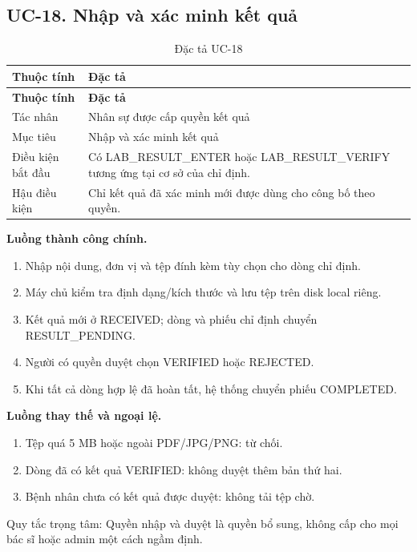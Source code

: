 \clearpage

\subsection{UC-18.\allowbreak{} Nhập và xác minh kết quả}
\label{uc:18}

{\small\setlength{\tabcolsep}{3pt}\renewcommand{\arraystretch}{1.12}
\begin{longtable}{@{}L{\textwidth-1.32pt\relax} L{\textwidth-4.68pt\relax}@{}}
\caption{Đặc tả UC-18}\\
\toprule
\textbf{Thuộc tính} & \textbf{Đặc tả}\\\midrule
\endfirsthead
\toprule
\textbf{Thuộc tính} & \textbf{Đặc tả}\\\midrule
\endhead
\bottomrule\endlastfoot
Tác nhân & Nhân sự được cấp quyền kết quả\\[3pt]
Mục tiêu & Nhập và xác minh kết quả\\[3pt]
Điều kiện bắt đầu & Có LAB\_\allowbreak{}RESULT\_\allowbreak{}ENTER hoặc LAB\_\allowbreak{}RESULT\_\allowbreak{}VERIFY tương ứng tại cơ sở của chỉ định.\allowbreak{}\\[3pt]
Hậu điều kiện & Chỉ kết quả đã xác minh mới được dùng cho công bố theo quyền.\allowbreak{}\\[3pt]
\end{longtable}}
\noindent\textbf{Luồng thành công chính.}
\begin{enumerate}
\item Nhập nội dung, đơn vị và tệp đính kèm tùy chọn cho dòng chỉ định.\allowbreak{}
\item Máy chủ kiểm tra định dạng/\allowbreak{}kích thước và lưu tệp trên disk local riêng.\allowbreak{}
\item Kết quả mới ở RECEIVED; dòng và phiếu chỉ định chuyển RESULT\_\allowbreak{}PENDING.\allowbreak{}
\item Người có quyền duyệt chọn VERIFIED hoặc REJECTED.\allowbreak{}
\item Khi tất cả dòng hợp lệ đã hoàn tất, hệ thống chuyển phiếu COMPLETED.\allowbreak{}
\end{enumerate}
\noindent\textbf{Luồng thay thế và ngoại lệ.}
\begin{enumerate}
\item Tệp quá 5 MB hoặc ngoài PDF/\allowbreak{}JPG/\allowbreak{}PNG:\allowbreak{} từ chối.\allowbreak{}
\item Dòng đã có kết quả VERIFIED:\allowbreak{} không duyệt thêm bản thứ hai.\allowbreak{}
\item Bệnh nhân chưa có kết quả được duyệt:\allowbreak{} không tải tệp chờ.\allowbreak{}
\end{enumerate}
Quy tắc trọng tâm:\allowbreak{} Quyền nhập và duyệt là quyền bổ sung, không cấp cho mọi bác sĩ hoặc admin một cách ngầm định.\allowbreak{}


